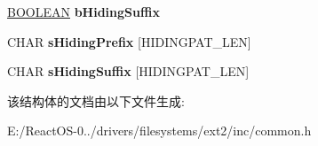 \begin{DoxyCompactItemize}
\hyperlink{_processor_bind_8h_a112e3146cb38b6ee95e64d85842e380a}{B\+O\+O\+L\+E\+AN} {\bfseries b\+Hiding\+Suffix}
\item 
\mbox{\label{struct___e_x_t2___v_o_l_u_m_e___p_r_o_p_e_r_t_y2_aec20d9c6eab9c008087a43f2c2dd7bb0}} 
C\+H\+AR {\bfseries s\+Hiding\+Prefix} \mbox{[}H\+I\+D\+I\+N\+G\+P\+A\+T\+\_\+\+L\+EN\mbox{]}
\item 
\mbox{\label{struct___e_x_t2___v_o_l_u_m_e___p_r_o_p_e_r_t_y2_a9696db740ff5dfe2706739d94b10b9b7}} 
C\+H\+AR {\bfseries s\+Hiding\+Suffix} \mbox{[}H\+I\+D\+I\+N\+G\+P\+A\+T\+\_\+\+L\+EN\mbox{]}
\end{DoxyCompactItemize}


该结构体的文档由以下文件生成\+:\begin{DoxyCompactItemize}
\item 
E\+:/\+React\+O\+S-\/0../drivers/filesystems/ext2/inc/common.\+h\end{DoxyCompactItemize}
